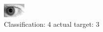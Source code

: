 \begin{figure}[h!]
\begin{center}
\includegraphics[width=0.60\columnwidth]{figures/ID306_class_4_target_3.png}
\end{center}
\caption{ Classification: 4 actual target: 3}
\label{fig:ID306_class_4_target_3}
\end{figure}
